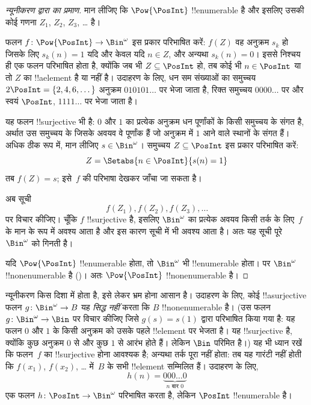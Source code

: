 \documentclass[../../../include/open-logic-section]{subfiles}
\begin{document}
\begin{proof}[न्यूनीकरण द्वारा {} का प्रमाण]
मान लीजिए कि $\Pow{\PosInt}$ !!{enumerable} है और इसलिए उसकी कोई गणना
$Z_{1}$, $Z_{2}$, $Z_{3}$, \dots{} है।

फलन $f \colon \Pow{\PosInt} \to \Bin^\omega$ इस प्रकार परिभाषित करें:
$f(Z)$ वह अनुक्रम $s_{k}$ हो जिसके लिए $s_{k}(n) = 1$ यदि और केवल यदि
$n \in Z$, और अन्यथा $s_k(n) = 0$। इससे निश्चय ही एक फलन परिभाषित होता है,
क्योंकि जब भी $Z \subseteq \PosInt$ हो, तब कोई भी $n \in \PosInt$ या तो
$Z$ का !!a{element} है या नहीं है। उदाहरण के लिए, धन सम संख्याओं का समुच्चय
$2\PosInt = \{2,
4, 6, \dots\}$ अनुक्रम $010101\dots$ पर भेजा जाता है,
रिक्त समुच्चय $0000\dots$ पर और स्वयं $\PosInt$, $1111\dots$ पर भेजा जाता
है।

यह फलन !!{surjective} भी है: $0$ और $1$ का प्रत्येक अनुक्रम धन पूर्णांकों के
किसी समुच्चय के संगत है, अर्थात उस समुच्चय के जिसके अवयव वे पूर्णांक हैं जो
अनुक्रम में $1$ आने वाले स्थानों के संगत हैं। अधिक ठीक रूप में, मान लीजिए
$s \in \Bin^\omega$। समुच्चय $Z
\subseteq \PosInt$ इस प्रकार परिभाषित
करें:
\[
Z = \Setabs{n \in \PosInt}{s(n) = 1}
\]
तब $f(Z) = s$; इसे~$f$ की परिभाषा देखकर जाँचा जा सकता है।

अब सूची
\[
f(Z_1), f(Z_2), f(Z_3), \dots
\]
पर विचार कीजिए। चूँकि $f$ !!{surjective} है, इसलिए $\Bin^\omega$ का प्रत्येक
अवयव किसी तर्क के लिए~$f$ के मान के रूप में अवश्य आता है और इस कारण सूची में
भी अवश्य आता है। अतः यह सूची पूरे~$\Bin^\omega$ को गिनती है।

यदि $\Pow{\PosInt}$ !!{enumerable} होता, तो $\Bin^\omega$ भी
!!{enumerable} होता। पर $\Bin^\omega$ !!{nonenumerable} है
()। अतः $\Pow{\PosInt}$
!!{nonenumerable} है।
\end{proof}

\begin{explain}
न्यूनीकरण किस दिशा में होता है, इसे लेकर भ्रम होना आसान है। उदाहरण के लिए,
कोई !!a{surjective} फलन $g \colon \Bin^\omega \to B$ यह \emph{सिद्ध नहीं}
करता कि $B$ !!{nonenumerable} है। (उस फलन $g
\colon \Bin^\omega \to \Bin$
पर विचार कीजिए जिसे $g(s) = s(1)$ द्वारा परिभाषित किया गया है: यह फलन
$0$ और $1$ के किसी अनुक्रम को उसके पहले !!{element} पर भेजता है। यह
!!{surjective} है, क्योंकि कुछ अनुक्रम $0$ से और कुछ $1$ से आरंभ होते हैं।
लेकिन $\Bin$ परिमित है।) यह भी ध्यान रखें कि फलन~$f$ का !!{surjective} होना
आवश्यक है; अन्यथा तर्क पूरा नहीं होता: तब यह गारंटी नहीं होती कि $f(x_1)$,
$f(x_2)$, \dots{} में~$B$ के सभी !!{element} सम्मिलित हैं। उदाहरण के लिए,
\[
h(n) = \underbrace{000\dots0}_{\text{$n$ बार $0$}}
\]
एक फलन $h\colon \PosInt \to
\Bin^\omega$ परिभाषित करता है, लेकिन
$\PosInt$ !!{enumerable} है।
\end{explain}
\end{document}
